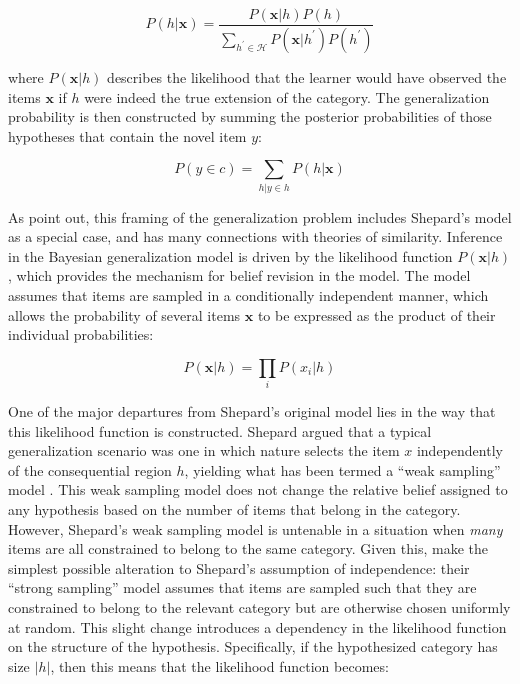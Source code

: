 \documentclass[doc,apacite]{apa6}
\begin{document}
\begin{equation}
\label{tg1}
P(h | \bm{x}) = \frac{P(\bm{x} | h) P(h)}{\sum_{h^\prime \in \mathcal{H}} P(\bm{x} | h^\prime) P(h^\prime)}
\end{equation}

\noindent
where $P(\bm{x} | h)$ describes the likelihood that the learner would have observed the items $\bm{x}$ if $h$ were indeed the true extension of the category. The generalization probability is then constructed by summing the posterior probabilities of those hypotheses that contain the novel item $y$:

\begin{equation}
\label{tg2}
P(y \in c) = \sum_{h | y \in h} P(h | \bm{x})
\end{equation}

\noindent
As  point out, this framing of the generalization problem includes Shepard's model as a special case, and has many connections with theories of similarity. Inference in the Bayesian generalization model is driven by the likelihood function $P(\bm{x}|h)$, which provides the mechanism for belief revision in the model. The model assumes that items are sampled in a conditionally independent manner, which allows the probability of several items $\bm{x}$ to be expressed as the product of their individual probabilities:

\begin{equation}
\label{tg3}
P(\bm{x} | h) = \prod_{i} P(x_i | h)
\end{equation}

One of the major departures from Shepard's original model lies in the way that this likelihood function is constructed. Shepard argued that a typical generalization scenario was one in which nature selects the item $x$ independently of the consequential region $h$, yielding what has been termed a ``weak sampling'' model \cite{tenenbaum1999bayesian}. This weak sampling model does not change the relative belief assigned to any hypothesis based on the number of items that belong in the category. However, Shepard's weak sampling model is untenable in a situation when {\it many} items are all constrained to belong to the same category. Given this,  make the simplest possible alteration to Shepard's assumption of independence: their ``strong sampling'' model assumes that items are sampled such that they are constrained to belong to the relevant category but are otherwise chosen uniformly at random. This slight change introduces a dependency in the likelihood function on the structure of the hypothesis. Specifically, if the hypothesized category has size $|h|$, then this means that the likelihood function becomes:
\end{document}
